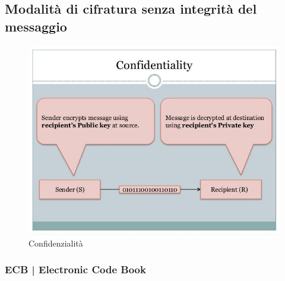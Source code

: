 \subsection{Modalità di cifratura senza integrità del messaggio}


\begin{figure}[H]
	\centering
	\includegraphics[width=.9\textwidth, height=.9\textheight, keepaspectratio]{./images/aes_modes/confidentiality.png}
	\caption{Confidenzialità}
	\label{fig:confidentiality}
\end{figure}

\textsf{\small }

\subsubsection{ECB | Electronic Code Book}




